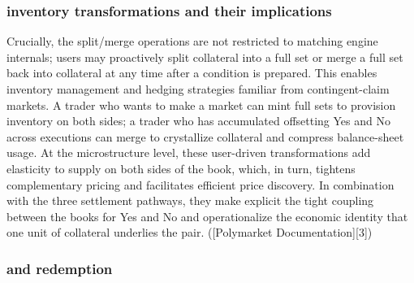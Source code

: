 \subsubsection{inventory transformations and their implications}

Crucially, the split/merge operations are not restricted to matching engine internals; users may proactively split collateral into a full set or merge a full set back into collateral at any time after a condition is prepared. This enables inventory management and hedging strategies familiar from contingent-claim markets. A trader who wants to make a market can mint full sets to provision inventory on both sides; a trader who has accumulated offsetting Yes and No across executions can merge to crystallize collateral and compress balance-sheet usage. At the microstructure level, these user-driven transformations add elasticity to supply on both sides of the book, which, in turn, tightens complementary pricing and facilitates efficient price discovery. In combination with the three settlement pathways, they make explicit the tight coupling between the books for Yes and No and operationalize the economic identity that one unit of collateral underlies the pair. ([Polymarket Documentation][3])

\subsubsection{and redemption}



